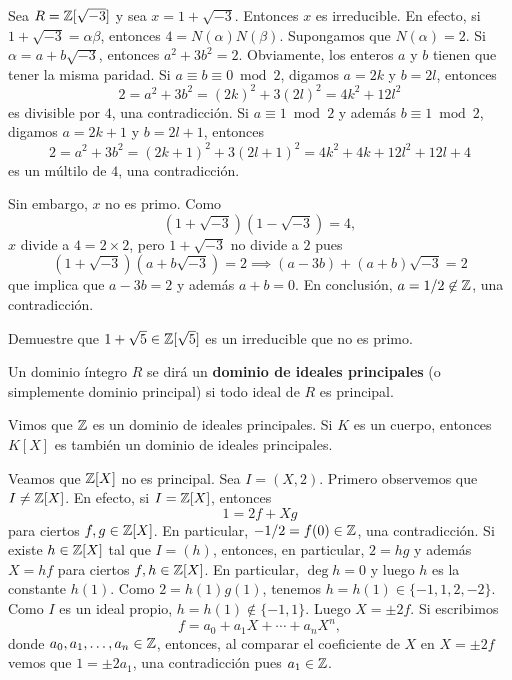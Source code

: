 \begin{example}
Sea $R=\mathbb{Z}[\sqrt{-3}]$ y sea $x=1+\sqrt{-3}$. Entonces $x$ es irreducible. En efecto,
si $1+\sqrt{-3}=\alpha\beta$, entonces $4=N(\alpha)N(\beta)$. 
Supongamos que $N(\alpha)=2$. Si $\alpha=a+b\sqrt{-3}$, entonces
$a^2+3b^2=2$. Obviamente, los enteros $a$ y $b$ tienen que tener la misma paridad. 
Si $a\equiv b\equiv 0\bmod 2$, digamos $a=2k$ y $b=2l$, entonces
\[
2=a^2+3b^2=(2k)^2+3(2l)^2=4k^2+12l^2
\]
es divisible por $4$, una contradicción. Si $a\equiv 1\bmod 2$ y además $b\equiv 1\bmod 2$, digamos
$a=2k+1$ y $b=2l+1$, entonces
\[
2=a^2+3b^2=(2k+1)^2+3(2l+1)^2=4k^2+4k+12l^2+12l+4
\]
es un múltilo de $4$, una contradicción. 

Sin embargo, $x$ no es primo. Como
\[
(1+\sqrt{-3})(1-\sqrt{-3})=4,
\]
$x$ divide a $4=2\times 2$, pero $1+\sqrt{-3}$ no divide a $2$ pues 
\[
(1+\sqrt{-3})(a+b\sqrt{-3})=2\implies
(a-3b)+(a+b)\sqrt{-3}=2
\]
que implica que $a-3b=2$ y además $a+b=0$. En conclusión, $a=1/2\not\in\mathbb{Z}$, una contradicción. 
\end{example}

\begin{exercise}
Demuestre que $1+\sqrt{5}\in\mathbb{Z}[\sqrt{5}]$ es un irreducible que no es primo.	
\end{exercise}

\begin{definition}
Un dominio íntegro $R$ se dirá un \textbf{dominio de ideales principales} (o simplemente dominio principal) si 
todo ideal de $R$ es principal. 	
\end{definition}

Vimos que $\mathbb{Z}$ es un dominio de ideales principales. Si $K$ es un cuerpo, entonces
$K[X]$ es también un dominio de ideales principales.

\begin{example}
Veamos que $\mathbb{Z}[X]$ no es principal. Sea $I=(X,2)$.
Primero observemos que $I\ne\mathbb{Z}[X]$. En efecto, si $I=\mathbb{Z}[X]$, entonces
\[
1=2f+Xg
\]
para ciertos $f,g\in\mathbb{Z}[X]$. En particular, $-1/2=f(0)\in\mathbb{Z}$, una contradicción. 
Si existe $h\in\mathbb{Z}[X]$ tal que $I=(h)$, entonces, en particular, $2=hg$ y además $X=hf$ para ciertos $f,h\in\mathbb{Z}[X]$. 
En particular, $\deg h=0$ y luego $h$ es la constante $h(1)$. Como $2=h(1)g(1)$, tenemos 
$h=h(1)\in\{-1,1,2,-2\}$. Como $I$ es un ideal propio,
$h=h(1)\not\in\{-1,1\}$. Luego  
$X=\pm 2f$. Si escribimos 
\[
f=a_0+a_1X+\cdots+a_nX^n,
\]
donde $a_0,a_1,\dots,a_n\in\mathbb{Z}$, entonces, al comparar el coeficiente de $X$ en $X=\pm 2f$ 
vemos que 
$1=\pm 2a_1$, una contradicción pues $a_1\in\mathbb{Z}$. 
\end{example}

